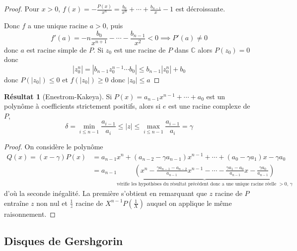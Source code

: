 \documentclass{article}
\theoremstyle{definition}
\newtheorem*{res}{Résultat}
\begin{document}
\begin{proof}
    Pour $x>0$, $f(x)=-\frac{P(x)}{x^n}=\frac{b_0}{x^n}+\cdots + \frac{b_{n-1}}{x}-1$ est décroissante.

    \begin{center}
    \end{center}
    Donc $f$ a une unique racine $a>0$, puis \[
        f'(a)=-n\frac{b_0}{x^{n+1}}-\cdots-\frac{b_{n-1}}{x^2}<0 \implies P'(a)\neq 0
    \]
    donc $a$ est racine simple de $P$. Si $z_0$ est une racine de $P$ dans $\mathbb C$ alors $P(z_0)=0$ donc \[
        |z_0^n|=|b_{n-1}z_0^{n-1}\cdots b_0|\leq b_{n-1}|z_0^n|+b_0
    \]
    donc $P(|z_0|)\leq 0$ et $f(|z_0|)\geq 0$ donc $|z_0|\leq a$
\end{proof}

\begin{res}[Enestrom-Kakeya]
    Si $P(x)=a_{n-1}x^{n-1}+\cdots +a_0$ est un polynôme à coefficients strictement positifs, alors si $e$ est une racine complexe de $P$, \[
        \delta=\min_{i\leq n-1}\frac{a_{i-1}}{a_i} \leq |z|\leq \max_{i\leq n-1}\frac{a_{i-1}}{a_i}=\gamma
    \]
\end{res}

\begin{proof}
    On considère le polynôme \begin{align*}
        Q(x)=(x-\gamma)P(x)&=a_{n-1}x^{n}+(a_{n-2}-\gamma a_{n-1})x^{n-1}+\cdots +(a_0-\gamma a_1)x -\gamma a_0\\ &= a_{n-1}\underbrace{\left(x^n-\frac{\gamma a_{n-1}-a_{n-2}}{a_{n-1}}x^{n-1} -\cdots -\frac{\gamma a_1-a_0}{a_{n-1}}x-\frac{\gamma a_0}{a_{n-1}}\right)}_{\text{vérifie les hypothèses du résultat précédent donc a une unique racine réelle $>0$, $\gamma$}}
    \end{align*}
    d'où la seconde inégalité. La première s'obtient en remarquant que $z$ racine de $P$ entraîne $z$ non nul et $\frac 1z$ racine de $X^{n-1}P\left(\frac1X\right)$ auquel on applique le même raisonnement.
\end{proof}

\subsection{Disques de Gershgorin}
\end{document}
